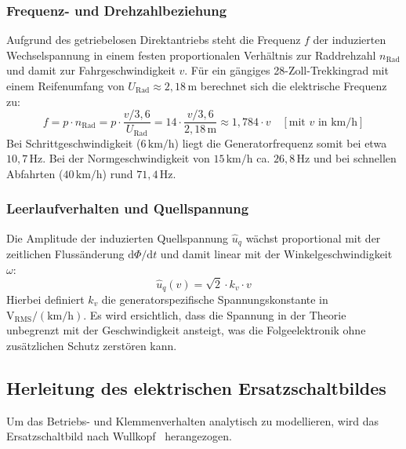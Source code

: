 \documentclass[12pt,a4paper]{article}
\begin{document}
\subsubsection{Frequenz- und Drehzahlbeziehung}
Aufgrund des getriebelosen Direktantriebs steht die Frequenz $f$ der induzierten Wechselspannung in einem festen proportionalen Verhältnis zur Raddrehzahl $n_{\text{Rad}}$ und damit zur Fahrgeschwindigkeit $v$. Für ein gängiges 28-Zoll-Trekkingrad mit einem Reifenumfang von $U_{\text{Rad}} \approx 2{,}18\,\text{m}$ berechnet sich die elektrische Frequenz zu:
\begin{equation}
    f = p \cdot n_{\text{Rad}} = p \cdot \frac{v / 3{,}6}{U_{\text{Rad}}} = 14 \cdot \frac{v / 3{,}6}{2{,}18\,\text{m}} \approx 1{,}784 \cdot v \quad [\text{mit } v \text{ in km/h}]
    \label{eq:frequenz_herleitung}
\end{equation}
Bei Schrittgeschwindigkeit ($6\,\text{km/h}$) liegt die Generatorfrequenz somit bei etwa $10{,}7\,\text{Hz}$. Bei der Normgeschwindigkeit von $15\,\text{km/h}$ ca. $26{,}8\,\text{Hz}$ 
und bei schnellen Abfahrten ($40\,\text{km/h}$) rund $71{,}4\,\text{Hz}$.

\subsubsection{Leerlaufverhalten und Quellspannung}
Die Amplitude der induzierten Quellspannung $\hat{u}_q$ wächst proportional mit der zeitlichen Flussänderung $\mathrm{d}\Phi/\mathrm{d}t$ und damit linear mit der Winkelgeschwindigkeit $\omega$:
\begin{equation}
    \hat{u}_q(v) = \sqrt{2} \cdot k_v \cdot v
    \label{eq:uq_linear}
\end{equation}
Hierbei definiert $k_v$ die generatorspezifische Spannungskonstante in $\text{V}_{\text{RMS}} / (\text{km/h})$. 
Es wird ersichtlich, dass die Spannung in der Theorie unbegrenzt mit der Geschwindigkeit ansteigt, was die Folgeelektronik ohne zusätzlichen Schutz zerstören kann.

\subsection{Herleitung des elektrischen Ersatzschaltbildes}
Um das Betriebs- und Klemmenverhalten analytisch zu modellieren, wird das Ersatzschaltbild nach Wullkopf~\cite{wullkopf1959} herangezogen.
\end{document}
